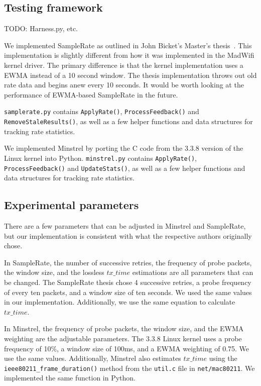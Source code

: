 \documentclass[letterpaper,twocolumn,10pt]{article}
\begin{document}
\subsection{Testing framework}

TODO: Harness.py, etc.

We implemented SampleRate as outlined in John Bicket's Master's thesis~\cite{samplerate}. This implementation is slightly different from how it was implemented in the MadWifi kernel driver. The primary difference is that the kernel implementation uses a EWMA instead of a 10 second window. The thesis implementation throws out old rate data and begins anew every 10 seconds. It would be worth looking at the performance of EWMA-based SampleRate in the future. 

\texttt{samplerate.py} contains \texttt{ApplyRate()}, \texttt{ProcessFeedback()} and  \texttt{RemoveStaleResults()}, as well as a few helper functions and data structures for tracking rate statistics. 

We implemented Minstrel by porting the C code from the 3.3.8 version of the Linux kernel into Python. \texttt{minstrel.py} contains \texttt{ApplyRate()}, \texttt{ProcessFeedback()} and  \texttt{UpdateStats()}, as well as a few helper functions and data structures for tracking rate statistics. 


\subsection{Experimental parameters}

There are a few parameters that can be adjusted in Minstrel and SampleRate, but our implementation is consistent with what the respective authors originally chose. 

In SampleRate, the number of successive retries, the frequency of probe packets, the window size, and the lossless $tx\_time$ estimations are all parameters that can be changed. The SampleRate thesis chose 4 successive retries, a probe frequency of every ten packets, and a window size of ten seconds. We used the same values in our implementation. Additionally, we use the same equation to calculate $tx\_time$.

In Minstrel, the frequency of probe packets, the window size, and the EWMA weighting are the adjustable parameters. The 3.3.8 Linux kernel uses a probe frequency of 10\%, a window size of 100ms, and a EWMA weighting of 0.75. We use the same values. Additionally, Minstrel also estimates $tx\_time$ using the \texttt{ieee80211\_frame\_duration()} method from the \texttt{util.c} file in \texttt{net/mac80211}. We implemented the same function in Python.
\end{document}
